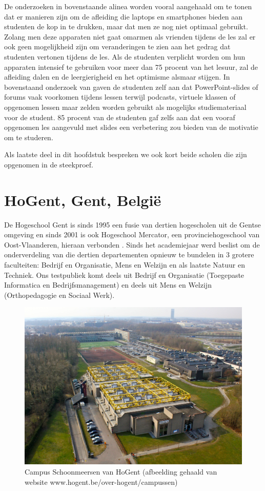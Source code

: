 De onderzoeken in bovenstaande alinea worden vooral aangehaald om te tonen dat er manieren zijn om de afleiding die laptops en smartphones bieden aan studenten de kop in te drukken, maar dat men ze nog niet optimaal gebruikt. Zolang men deze apparaten niet gaat omarmen als vrienden tijdens de les zal er ook geen mogelijkheid zijn om veranderingen te zien aan het gedrag dat studenten vertonen tijdens de les. Als de studenten verplicht worden om hun apparaten intensief te gebruiken voor meer dan 75 procent van het lesuur, zal de afleiding dalen en de leergierigheid en het optimisme alsmaar stijgen. In bovenstaand onderzoek van \textcite{Farley2015} gaven de studenten zelf aan dat PowerPoint-slides of forums vaak voorkomen tijdens lessen terwijl podcasts, virtuele klassen of opgenomen lessen maar zelden worden gebruikt als mogelijks studiemateriaal voor de student. 85 procent van de studenten gaf zelfs aan dat een vooraf opgenomen les aangevuld met slides een verbetering zou bieden van de motivatie om te studeren.

Als laatste deel in dit hoofdstuk bespreken we ook kort beide scholen die zijn opgenomen in de steekproef.

\section{HoGent, Gent, België}
\label{sec:hogent}

De Hogeschool Gent is sinds 1995 een fusie van dertien hogescholen uit de Gentse omgeving en sinds 2001 is ook Hogeschool Mercator, een provinciehogeschool van Oost-Vlaanderen, hieraan verbonden \autocite{HoGent2018}. Sinds het academiejaar werd beslist om de onderverdeling van die dertien departementen opnieuw te bundelen in 3 grotere faculteiten: Bedrijf en Organisatie, Mens en Welzijn en als laatste Natuur en Techniek. Ons testpubliek komt deels uit Bedrijf en Organisatie (Toegepaste Informatica en Bedrijfsmanagement) en deels uit Mens en Welzijn (Orthopedagogie en Sociaal Werk). 

\begin{figure}[!h]
	\includegraphics[width=\textwidth]
	{img/campus_hogent.JPG}
	\caption{Campus Schoonmeersen van HoGent (afbeelding gehaald van website www.hogent.be/over-hogent/campussen)}
	\label{fig:campushogent}
\end{figure}

